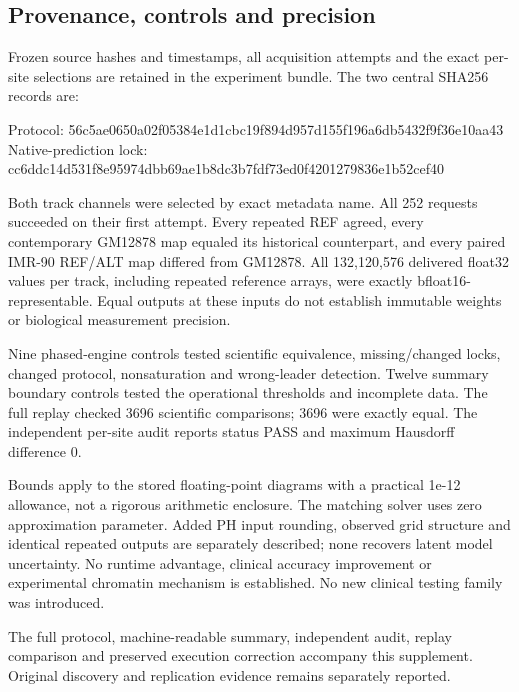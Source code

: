 \documentclass[
  11pt,
]{article}
\newenvironment{Shaded}{}{}
\newcommand{\NormalTok}[1]{#1}
\newcounter{none} %
\begin{document}
\subsection{Provenance, controls and
precision}\label{provenance-controls-and-precision}

Frozen source hashes and timestamps, all acquisition attempts and the
exact per-site selections are retained in the experiment bundle. The two
central SHA256 records are:

\begin{Shaded}
\begin{Highlighting}[]
\NormalTok{Protocol:}
\NormalTok{56c5ae0650a02f05384e1d1cbc19f894d957d155f196a6db5432f9f36e10aa43}
\NormalTok{Native{-}prediction lock:}
\NormalTok{cc6ddc14d531f8e95974dbb69ae1b8dc3b7fdf73ed0f4201279836e1b52cef40}
\end{Highlighting}
\end{Shaded}

Both track channels were selected by exact metadata name. All 252
requests succeeded on their first attempt. Every repeated REF agreed,
every contemporary GM12878 map equaled its historical counterpart, and
every paired IMR-90 REF/ALT map differed from GM12878. All 132,120,576
delivered float32 values per track, including repeated reference arrays,
were exactly bfloat16-representable. Equal outputs at these inputs do
not establish immutable weights or biological measurement precision.

Nine phased-engine controls tested scientific equivalence,
missing/changed locks, changed protocol, nonsaturation and wrong-leader
detection. Twelve summary boundary controls tested the operational
thresholds and incomplete data. The full replay checked 3696 scientific
comparisons; 3696 were exactly equal. The independent per-site audit
reports status PASS and maximum Hausdorff difference 0.

Bounds apply to the stored floating-point diagrams with a practical
1e-12 allowance, not a rigorous arithmetic enclosure. The matching
solver uses zero approximation parameter. Added PH input rounding,
observed grid structure and identical repeated outputs are separately
described; none recovers latent model uncertainty. No runtime advantage,
clinical accuracy improvement or experimental chromatin mechanism is
established. No new clinical testing family was introduced.

The full protocol, machine-readable summary, independent audit, replay
comparison and preserved execution correction accompany this supplement.
Original discovery and replication evidence remains separately reported.
\end{document}
